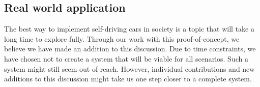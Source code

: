 \subsection{Real world application}
The best way to implement self-driving cars in society is a topic that will take a long time to explore fully. Through our work with this proof-of-concept, we believe we have made an addition to this discussion. Due to time constraints, we have chosen not to create a system that will be viable for all scenarios. Such a system might still seem out of reach. However, individual contributions and new additions to this discussion might take us one step closer to a complete system.


%

% 